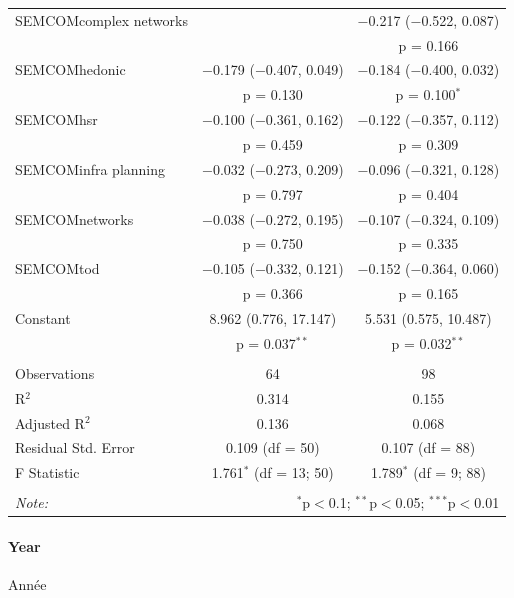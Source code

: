 \begin{table}[!htbp]
\begin{tabular}{@{\extracolsep{5pt}}lcc}
  SEMCOMcomplex networks &  & $-$0.217 ($-$0.522, 0.087) \\ 
  &  & p = 0.166 \\ 
  SEMCOMhedonic & $-$0.179 ($-$0.407, 0.049) & $-$0.184 ($-$0.400, 0.032) \\ 
  & p = 0.130 & p = 0.100$^{*}$ \\ 
  SEMCOMhsr & $-$0.100 ($-$0.361, 0.162) & $-$0.122 ($-$0.357, 0.112) \\ 
  & p = 0.459 & p = 0.309 \\ 
  SEMCOMinfra planning & $-$0.032 ($-$0.273, 0.209) & $-$0.096 ($-$0.321, 0.128) \\ 
  & p = 0.797 & p = 0.404 \\ 
  SEMCOMnetworks & $-$0.038 ($-$0.272, 0.195) & $-$0.107 ($-$0.324, 0.109) \\ 
  & p = 0.750 & p = 0.335 \\ 
  SEMCOMtod & $-$0.105 ($-$0.332, 0.121) & $-$0.152 ($-$0.364, 0.060) \\ 
  & p = 0.366 & p = 0.165 \\ 
  Constant & 8.962 (0.776, 17.147) & 5.531 (0.575, 10.487) \\ 
  & p = 0.037$^{**}$ & p = 0.032$^{**}$ \\ 
 \hline \\[-1.8ex] 
Observations & 64 & 98 \\ 
R$^{2}$ & 0.314 & 0.155 \\ 
Adjusted R$^{2}$ & 0.136 & 0.068 \\ 
Residual Std. Error & 0.109 (df = 50) & 0.107 (df = 88) \\ 
F Statistic & 1.761$^{*}$ (df = 13; 50) & 1.789$^{*}$ (df = 9; 88) \\ 
\hline 
\hline \\[-1.8ex] 
\textit{Note:}  & \multicolumn{2}{r}{$^{*}$p$<$0.1; $^{**}$p$<$0.05; $^{***}$p$<$0.01} \\ 
\end{tabular} 
\end{table} 




\paragraph{Year}{Année}



